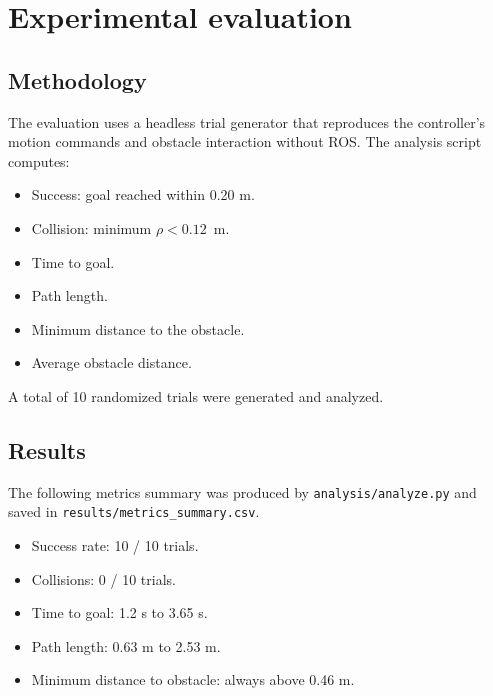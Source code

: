 \documentclass[11pt,a4paper]{article}
\begin{document}
\section{Experimental evaluation}
\subsection{Methodology}
The evaluation uses a headless trial generator that reproduces the controller's motion commands and obstacle interaction without ROS. The analysis script computes:
\begin{itemize}
  \item Success: goal reached within 0.20 m.
  \item Collision: minimum $\rho < 0.12$~m.
  \item Time to goal.
  \item Path length.
  \item Minimum distance to the obstacle.
  \item Average obstacle distance.
\end{itemize}
A total of 10 randomized trials were generated and analyzed.

\subsection{Results}
The following metrics summary was produced by \texttt{analysis/analyze.py} and saved in \texttt{results/metrics_summary.csv}.
\begin{itemize}
  \item Success rate: 10 / 10 trials.
  \item Collisions: 0 / 10 trials.
  \item Time to goal: 1.2 s to 3.65 s.
  \item Path length: 0.63 m to 2.53 m.
  \item Minimum distance to obstacle: always above 0.46 m.
\end{itemize}
\end{document}

